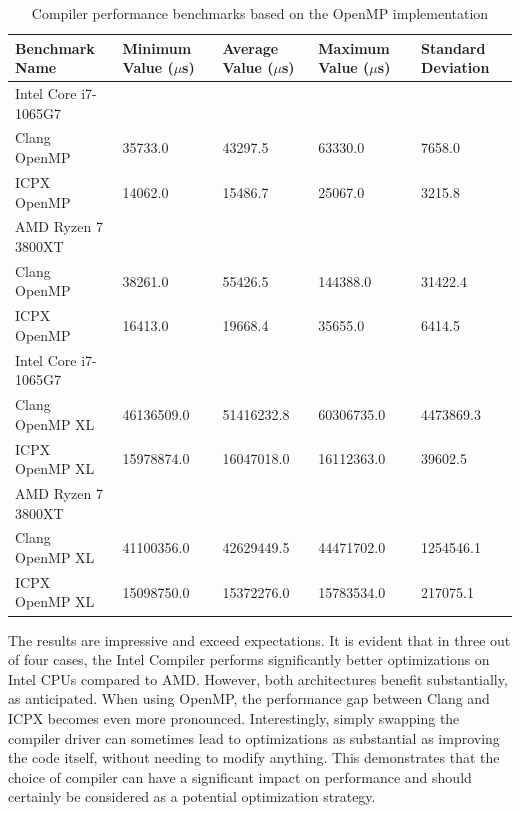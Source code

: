 \documentclass[modern,longauthor]{aastex7}
\begin{document}
\begin{table}[htb!]
\centering
\caption{Compiler performance benchmarks based on the OpenMP implementation\label{tab:icpx_openmp}}
\begin{tabular}{p{5cm} p{2cm} p{2cm} p{2cm} p{2cm}}
\hline
Benchmark Name & Minimum Value ($\mu$s) & Average Value ($\mu$s) & Maximum Value ($\mu$s) & Standard Deviation \\
\hline
Intel Core i7-1065G7 \\
\hspace{0.5cm}Clang OpenMP & 35733.0 & 43297.5 & 63330.0 & 7658.0 \\
\hspace{0.5cm}ICPX OpenMP & 14062.0 & 15486.7 & 25067.0 & 3215.8 \\
AMD Ryzen 7 3800XT \\
\hspace{0.5cm}Clang OpenMP & 38261.0 & 55426.5 & 144388.0 & 31422.4 \\
\hspace{0.5cm}ICPX OpenMP & 16413.0 & 19668.4 & 35655.0 & 6414.5 \\
\hline
Intel Core i7-1065G7 \\
\hspace{0.5cm}Clang OpenMP XL & 46136509.0 & 51416232.8 & 60306735.0 & 4473869.3 \\
\hspace{0.5cm}ICPX OpenMP XL & 15978874.0 & 16047018.0 & 16112363.0 & 39602.5 \\
AMD Ryzen 7 3800XT \\
\hspace{0.5cm}Clang OpenMP XL & 41100356.0 & 42629449.5 & 44471702.0 & 1254546.1 \\
\hspace{0.5cm}ICPX OpenMP XL & 15098750.0 & 15372276.0 & 15783534.0 & 217075.1 \\
\hline
\end{tabular}
\end{table}
\FloatBarrier

The results are impressive and exceed expectations. It is evident that in three out of four cases, the Intel Compiler performs significantly better optimizations on Intel CPUs compared to AMD. However, both architectures benefit substantially, as anticipated. When using OpenMP, the performance gap between Clang and ICPX becomes even more pronounced. Interestingly, simply swapping the compiler driver can sometimes lead to optimizations as substantial as improving the code itself, without needing to modify anything. This demonstrates that the choice of compiler can have a significant impact on performance and should certainly be considered as a potential optimization strategy.
\end{document}
